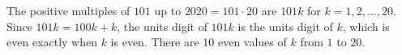 The positive multiples of $101$ up to $2020=101\cdot20$ are $101k$ for $k=1,2,\dots,20$. Since $101k=100k+k$, the units digit of $101k$ is the units digit of $k$, which is even exactly when $k$ is even. There are $\boxed{10}$ even values of $k$ from $1$ to $20$.
